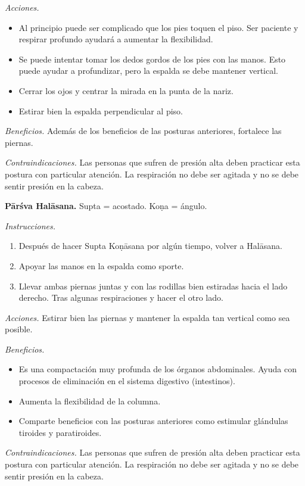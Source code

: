 \emph{Acciones.}
\begin{itemize}
\item Al principio puede ser complicado que
los pies toquen el piso. Ser paciente y
respirar profundo ayudará a aumentar la
flexibilidad.
\item Se puede intentar tomar los dedos
gordos de los pies con las manos. Esto puede
ayudar a profundizar, pero la espalda se debe
mantener vertical.
\item Cerrar los ojos y centrar la mirada en
la punta de la nariz.
\item Estirar bien la espalda perpendicular
al piso.
\end{itemize}

\emph{Beneficios.} Además de los beneficios
de las posturas anteriores, fortalece las
piernas.

\emph{Contraindicaciones.} Las personas que
sufren de presión alta deben practicar esta
postura con particular atención. La
respiración no debe ser agitada y no se debe
sentir presión en la cabeza.

\medskip\noindent\textbf{Pārśva Halāsana.}
Supta = acostado. Koṇa = ángulo.

\emph{Instrucciones.}
\begin{enumerate}
\item Después de hacer Supta Koṇāsana por
algún tiempo, volver a Halāsana.
\item Apoyar las manos en la espalda como
sporte.
\item Llevar ambas piernas juntas y con las
rodillas bien estiradas hacia el lado
derecho. Tras algunas respiraciones y hacer
el otro lado.
\end{enumerate}

\emph{Acciones.} Estirar bien las piernas y
mantener la espalda tan vertical como sea
posible.

\emph{Beneficios.}
\begin{itemize}
\item Es una compactación muy profunda de los
órganos abdominales. Ayuda con procesos de
eliminación en el sistema digestivo
(intestinos).
\item Aumenta la flexibilidad de la columna.
\item Comparte beneficios con las posturas
anteriores como estimular glándulas tiroides
y paratiroides.
\end{itemize}

\emph{Contraindicaciones.} Las personas que
sufren de presión alta deben practicar esta
postura con particular atención. La
respiración no debe ser agitada y no se debe
sentir presión en la cabeza.

